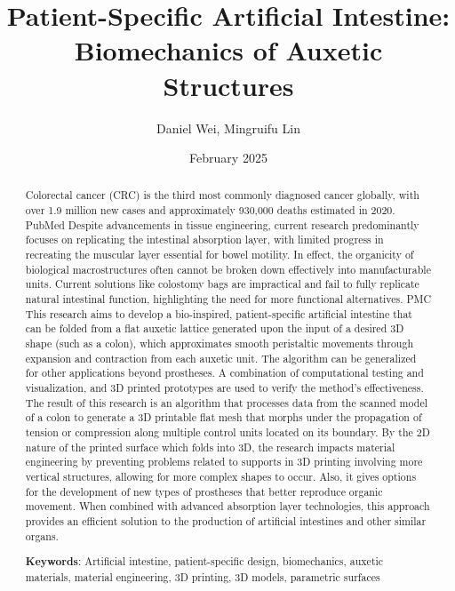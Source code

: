 \documentclass{article}
\title{Patient-Specific Artificial Intestine: Biomechanics of Auxetic Structures}
\author{Daniel Wei, Mingruifu Lin}
\date{February 2025}
\begin{document}
\maketitle

\begin{abstract}
  Colorectal cancer (CRC) is the third most commonly diagnosed cancer globally, with over 1.9 million new cases and approximately 930,000 deaths estimated in 2020. PubMed Despite advancements in tissue engineering, current research predominantly focuses on replicating the intestinal absorption layer, with limited progress in recreating the muscular layer essential for bowel motility. In effect, the organicity of biological macrostructures often cannot be broken down effectively into manufacturable units. Current solutions like colostomy bags are impractical and fail to fully replicate natural intestinal function, highlighting the need for more functional alternatives. PMC This research aims to develop a bio-inspired, patient-specific artificial intestine that can be folded from a flat auxetic lattice generated upon the input of a desired 3D shape (such as a colon), which approximates smooth peristaltic movements through expansion and contraction from each auxetic unit. The algorithm can be generalized for other applications beyond prostheses. A combination of computational testing and visualization, and 3D printed prototypes are used to verify the method's effectiveness. The result of this research is an algorithm that processes data from the scanned model of a colon to generate a 3D printable flat mesh that morphs under the propagation of tension or compression along multiple control units located on its boundary. By the 2D nature of the printed surface which folds into 3D, the research impacts material engineering by preventing problems related to supports in 3D printing involving more vertical structures, allowing for more complex shapes to occur. Also, it gives options for the development of new types of prostheses that better reproduce organic movement. When combined with advanced absorption layer technologies, this approach provides an efficient solution to the production of artificial intestines and other similar organs.

  \textbf{Keywords}: Artificial intestine, patient-specific design, biomechanics, auxetic materials, material engineering, 3D printing, 3D models, parametric surfaces
\end{abstract}

\pagebreak

\tableofcontents
\end{document}
